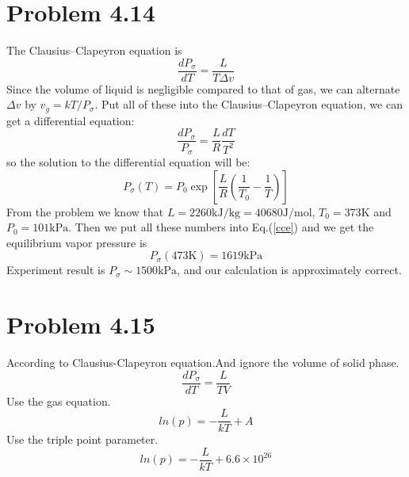 \documentclass{article}
\begin{document}
\section*{Problem 4.14}
The Clausius–Clapeyron equation is
$$
\frac{dP_\sigma}{dT} = \frac{L}{T\Delta v}
$$
Since the volume of liquid is negligible compared to that of gas, we can alternate $\Delta v$ by $v_g = kT/P_\sigma$. Put all of these into the Clausius–Clapeyron equation, we can get a differential equation:
\begin{equation}
\frac{dP_\sigma}{P_\sigma} = \frac{L}{R}\frac{dT}{T^2}
\end{equation}
so the solution to the differential equation will be:
\begin{equation}\label{cce}
P_\sigma(T) = P_0\exp\left[\frac{L}{R}\left(\frac{1}{T_0}-\frac{1}{T}\right)\right]
\end{equation}
From the problem we know that $L = 2260\mathrm{kJ/kg} = 40680\mathrm{J/mol}$, $T_0 =373\mathrm{K}$ and $P_0 = 101\mathrm{kPa}$. Then we put all these numbers into Eq.(\ref{cce}) and we get the equilibrium vapor pressure is
$$
P_\sigma(473\mathrm{K}) = 1619\mathrm{kPa}
$$
Experiment result is $P_\sigma \sim 1500\mathrm{kPa}$, and our calculation is approximately correct.

\section*{Problem 4.15} %
\label{sec:problem_4_15}
	

	According to Clausius-Clapeyron equation.And ignore the volume of solid phase.
	$$\frac{dP_{\sigma}}{dT}=\frac{L}{TV}$$
	Use the gas equation.
	$$ln(p)=-\frac{L}{kT}+A$$
	Use the triple point parameter.
	$$ln(p)=-\frac{L}{kT}+6.6\times10^{26}$$
\end{document}
